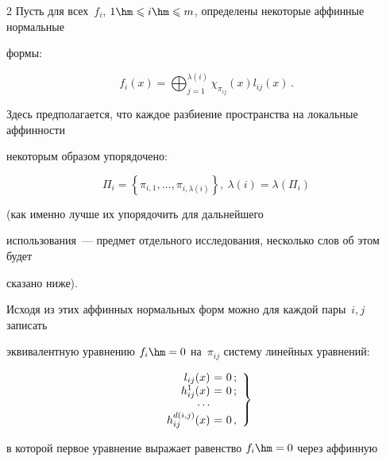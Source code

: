 \begin{multicols}{2}
Пусть для всех~$f_i$, $1\hm\leqslant i\hm\leqslant m$, определены некоторые аффинные нормальные 


формы:


\begin{equation*}


\label{AffNF_ij}


    f_i(x) = \bigoplus_{j=1}^{\lambda(i)} \chi_{\pi_{ij}}(x)l_{ij}(x)\,.


\end{equation*}


Здесь предполагается, что каждое разбиение пространства на локальные аффинности 


некоторым образом упорядочено: 


$$


\Pi_i=\left\{\pi_{i,1},\ldots,\pi_{i,\lambda(i)}\right\}, \


\lambda(i)=\lambda(\Pi_i)


$$ 


(как именно лучше их упорядочить для дальнейшего 


использования~--- предмет отдельного исследования, несколько слов об этом будет 


сказано ниже).


Исходя из этих аффинных нормальных форм можно для каждой пары~$i,j$ записать 


эквивалентную уравнению $f_i\hm=0$ на~$\pi_{ij}$ систему линейных уравнений:


\begin{equation}


\label{approx}


  \left.


    \begin{array}{r@{\ }c@{\ }l}


        l_{ij}(x)&=&0\,;\\


        h_{ij}^1(x)&=&0\,;\\


        \cdots\\


        h_{ij}^{d(i,j)}(x)&=&0\,,\\


    \end{array}


  \right\}


\end{equation}


в которой первое уравнение выражает равенство $f_i\hm=0$ через аффинную 



\end{multicols}
